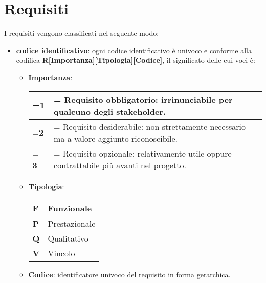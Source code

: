 \section{Requisiti}

    I requisiti vengono classificati nel seguente modo:
    \begin{itemize}
        \item \textbf{codice identificativo}: ogni codice identificativo è univoco e conforme alla codifica \textbf{R[Importanza][Tipologia][Codice]}, il significato delle cui voci è:
        \begin{itemize}
            \item \textbf{Importanza}:
            \begin{center}
                \renewcommand{\arraystretch}{1.8}
                \renewcommand\tabularxcolumn[1]{m{#1}}
                \begin{tabularx}{0.85\textwidth} {
                    >{\hsize=0.1\hsize\linewidth=\hsize}X
                    >{\hsize=1.9\hsize\linewidth=\hsize}X
                }
                    \hline
                    \textbf{1} & Requisito obbligatorio: irrinunciabile per qualcuno degli stakeholder. \\
                    \hline
                    \textbf{2} & Requisito desiderabile: non strettamente necessario ma  a valore aggiunto riconoscibile. \\
                    \hline
                    \textbf{3} &  Requisito opzionale: relativamente utile oppure contrattabile più avanti nel progetto. \\
                    \hline
                \end{tabularx}
            \end{center}

            \item \textbf{Tipologia}:
            \begin{center}
                \renewcommand{\arraystretch}{1.5}
                \begin{tabular}{m{2em} m{10em}}
                    \hline
                    \textbf{F} & Funzionale \\
                    \hline
                    \textbf{P} & Prestazionale \\
                    \hline
                    \textbf{Q} & Qualitativo \\
                    \hline
                    \textbf{V} &  Vincolo \\
                    \hline
                \end{tabular}
            \end{center}
            \item \textbf{Codice}: identificatore univoco del requisito in forma gerarchica.
        \end{itemize}


\end{itemize}
